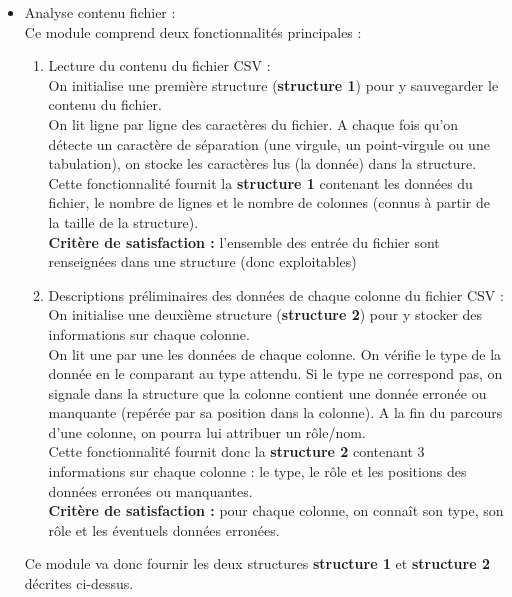\begin{itemize}
			\item Analyse contenu fichier :\\
				Ce module comprend deux fonctionnalités principales :
				\begin{enumerate}
					\item Lecture du contenu du fichier CSV :\\
					On initialise une première structure (\textbf{structure 1}) pour y sauvegarder le contenu du fichier.\\
					On lit ligne par ligne des caractères du fichier. A chaque fois qu'on détecte un caractère de séparation (une virgule, un point-virgule ou une tabulation), on stocke les caractères lus (la donnée) dans la structure.\\
					Cette fonctionnalité fournit la \textbf{structure 1} contenant les données du fichier, le nombre de lignes et le nombre de colonnes (connus à partir de la taille de la structure).\\
					\textbf{Critère de satisfaction : } l'ensemble des entrée du fichier sont renseignées dans une structure (donc exploitables)
					\item Descriptions préliminaires des données de chaque colonne du fichier CSV :\\
					On initialise une deuxième structure (\textbf{structure 2}) pour y stocker des informations sur chaque colonne.\\
					On lit une par une les données de chaque colonne. On vérifie le type de la donnée en le comparant au type attendu. Si le type ne correspond pas, on signale dans la structure que la colonne contient une donnée erronée ou manquante (repérée par sa position dans la colonne). A la fin du parcours d'une colonne, on pourra lui attribuer un rôle/nom.\\
					Cette fonctionnalité fournit donc la \textbf{structure 2} contenant 3 informations sur chaque colonne : le type, le rôle et les positions des données erronées ou manquantes.\\
					\textbf{Critère de satisfaction : } pour chaque colonne, on connaît son type, son rôle et les éventuels données erronées.
				\end{enumerate}
				Ce module va donc fournir les deux structures \textbf{structure 1} et \textbf{structure 2} décrites ci-dessus.
				

\end{itemize}
